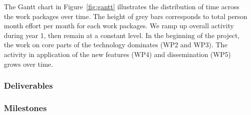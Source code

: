 
\pagebreak The Gantt chart in
Figure~\ref{fig:gantt} %
illustrates the distribution of time across the work packages over time.
The height of grey bars corresponds to total person month effort per
month for each work packages. We ramp up overall activity during year 1, then remain
at a constant level. In the beginning of the project, the work on core parts of
the technology dominates (WP2 and WP3). The activity in application of the new features (WP4) and dissemination
(WP5) grows over time.
\ganttchart[draft,xscale=.4,milestones,yscale=0.9,step=3]


\ifgrantagreement\else
\newpage
\subsubsection{Deliverables}\label{sec:deliverables}
\fi

\subsubsection{Milestones}\label{sec:milestones}









